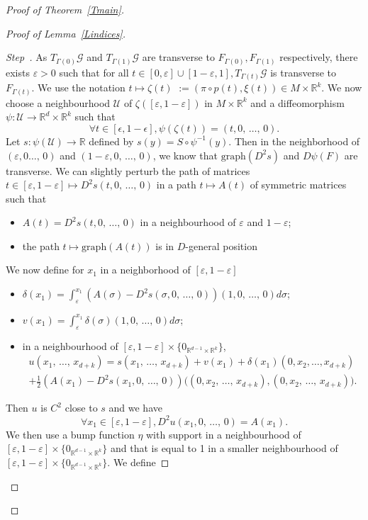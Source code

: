\documentclass[AHL, Unicode, longabstracts, published]{cedram}
\newcommand*\cg{\mathcal{G}}
\newcommand*\cU{\mathcal{U}}
\newcommand*\cal{\mathcal}
\newcommand{\Graph}{\mathrm{graph}}
\newcommand*\R{\mathbb{R}}
\newcounter{stepcount}
\newenvironment{step}{\refstepcounter{stepcount}\begin{proof}[Step~\thestepcount]}{\let\qed\relax\end{proof}}
\let\oldforall\forall
\renewcommand*{\forall}{\mathrel{\oldforall}}
\begin{document}
\begin{proof}[Proof of Theorem~\ref{Tmain}]
\begin{proof}[Proof of Lemma~\ref{Lindices}]
\begin{step}\label{step1}
As $T_{\Gamma(0)}\cg$ and $T_{\Gamma(1)}\cg$ are transverse to $F_{\Gamma(0)},F_{\Gamma(1)}$ respectively, there exists $\varepsilon>0$ such that for all $ t\in [0, \varepsilon]\cup[1-\varepsilon, 1], T_{\Gamma(t)}\cg$ is transverse to $F_{\Gamma(t)}$. We use the notation $t\mapsto \zeta(t)$ $ := (\pi\circ p(t), \xi(t))\in M\times \R^k$. We now choose a neighbourhood $\cal U$ of {$\zeta([\varepsilon, 1-\varepsilon])$} in $M\times \R^k$ and a diffeomorphism $\psi: \cal U\rightarrow \R^d\times \R^k$ such that
\[
\forall t\in [\epsilon,1-\epsilon],
{\psi(\zeta (t))}=(t, 0,\, \dots,\, 0).
\]
Let $s:\psi(\cU)\rightarrow \R$ defined by $s(y)=S\circ \psi^{-1}(y)$. Then in the neighborhood of $(\varepsilon, 0\dots,\,0)$ and $(1-\varepsilon, 0,\,\dots,\,0)$, we know that $\Graph(D^2s)$ and $D\psi(F)$ are transverse. We can slightly perturb the path of matrices $t\in [\varepsilon, 1-\varepsilon]\mapsto D^2s(t, 0,\,\dots,\,0)$ in a path $t\mapsto A(t)$ of symmetric matrices such that
\begin{itemize}
\item $A(t)=D^2s(t, 0,\,\dots,\,0)$ in a neighbourhood of $\varepsilon$ and $1-\varepsilon$;
\item the path $t\mapsto \Graph(A(t))$ is in $D$-general position
\end{itemize}
We now define for $x_1$ in a neighborhood of $[\varepsilon, 1-\varepsilon]$
\begin{itemize}
\item $\delta(x_1)=\int_\varepsilon^{x_1}(A(\sigma)-D^2s(\sigma, 0,\,\dots,\,0))(1, 0,\, \dots,\, 0)d\sigma$;
\item $v(x_1)=\int_\varepsilon ^{x_1}\delta(\sigma)(1,0,\,\dots,\,0)d\sigma$;
\item in a neighbourhood of $[\varepsilon, 1-\varepsilon]\times \{ 0_{\R^{d-1}\times \R^k}\}$,
\begin{multline*}
u\left(x_1,\,\dots,\,x_{d+k}\right)=s\left(x_1,\,\dots,\,x_{d+k}\right)+v(x_1)+\delta(x_1)\left(0,x_2, \dots, x_{d+k}\right)
\\
+\frac{1}{2}(A(x_1)-D^2s(x_1,0,\,\dots,\,0))\big((0, x_2, \,\dots,\,x_{d+k}), (0, x_2, \,\dots,\, x_{d+k})\big).
\end{multline*}
\end{itemize}
Then $u$ is $C^2$ close to $s$ and we have
\[
\forall x_1\in [\varepsilon, 1-\varepsilon], D^2u(x_1, 0,\,\dots,\,0)=A(x_1).
\]
We then use a bump function $\eta$ with support in a neighbourhood of $[\varepsilon, 1-\varepsilon]\times \{ 0_{\R^{d-1}\times \R^k}\}$ and that is equal to 1 in a smaller neighbourhood of $[\varepsilon, 1-\varepsilon]\times \{ 0_{\R^{d-1}\times \R^k}\}$. We define

\end{step}
\end{proof}
\end{proof}
\end{document}
